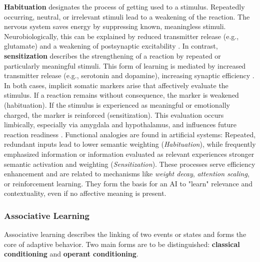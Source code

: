 \textbf{Habituation} designates the process of getting used to a stimulus.
Repeatedly occurring, neutral, or irrelevant stimuli lead to a weakening of the reaction.
The nervous system saves energy by suppressing known, meaningless stimuli.
Neurobiologically, this can be explained by reduced transmitter release (e.g., glutamate) and a weakening of postsynaptic excitability \cite{Kandel2001}.
In contrast, \textbf{sensitization} describes the strengthening of a reaction by repeated or particularly meaningful stimuli.
This form of learning is mediated by increased transmitter release (e.g., serotonin and dopamine), increasing synaptic efficiency \cite{LeDoux1996, Panksepp1998}.
In both cases, implicit somatic markers arise that affectively evaluate the stimulus.
If a reaction remains without consequence, the marker is weakened (habituation). If the stimulus is experienced as meaningful or emotionally charged, the marker is reinforced (sensitization).
This evaluation occurs limbically, especially via amygdala and hypothalamus, and influences future reaction readiness \cite{Damasio1999}.
Functional analogies are found in artificial systems:
Repeated, redundant inputs lead to lower semantic weighting (\emph{Habituation}), while frequently emphasized information or information evaluated as relevant experiences stronger semantic activation and weighting (\emph{Sensitization}).
These processes serve efficiency enhancement and are related to mechanisms like \emph{weight decay}, \emph{attention scaling}, or reinforcement learning.
They form the basis for an AI to "learn" relevance and contextuality, even if no affective meaning is present.

\subsubsection*{Associative Learning}

Associative learning describes the linking of two events or states and forms the core of adaptive behavior.
Two main forms are to be distinguished: \textbf{classical conditioning} and \textbf{operant conditioning}.

